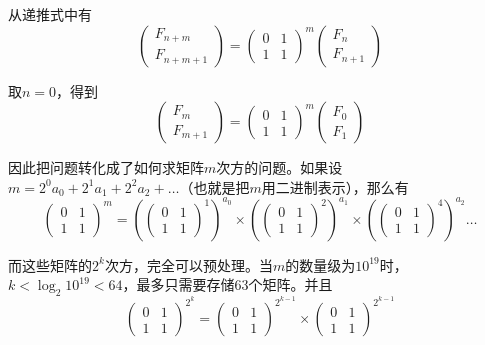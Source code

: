 \documentclass[UTF8,12pt]{ctexart}
\begin{document}
从递推式中有
\[\begin{pmatrix}F_{n+m}\\F_{n+m+1}\end{pmatrix}=\begin{pmatrix}0&1\\1&1\end{pmatrix}^m\begin{pmatrix}F_{n}\\F_{n+1}\end{pmatrix}\]

取$n=0$，得到
\[\begin{pmatrix}F_{m}\\F_{m+1}\end{pmatrix}=\begin{pmatrix}0&1\\1&1\end{pmatrix}^m\begin{pmatrix}F_0\\F_1\end{pmatrix}\]

因此把问题转化成了如何求矩阵$m$次方的问题。如果设$m=2^0a_0+2^1a_1+2^2a_2+\dots$（也就是把$m$用二进制表示），那么有
\[\begin{pmatrix}0&1\\1&1\end{pmatrix}^m=\left(\begin{pmatrix}0&1\\1&1\end{pmatrix}^{1}\right)^{a_0}\times \left(\begin{pmatrix}0&1\\1&1\end{pmatrix}^{2}\right)^{a_1}\times \left(\begin{pmatrix}0&1\\1&1\end{pmatrix}^{4}\right)^{a_2}\dots\]

而这些矩阵的$2^k$次方，完全可以预处理。当$m$的数量级为$10^{19}$时，$k<\log_2 10^{19}<64$，最多只需要存储63个矩阵。并且
\[\begin{pmatrix}0&1\\1&1\end{pmatrix}^{2^k}=\begin{pmatrix}0&1\\1&1\end{pmatrix}^{2^{k-1}}\times \begin{pmatrix}0&1\\1&1\end{pmatrix}^{2^{k-1}}\]
\end{document}
